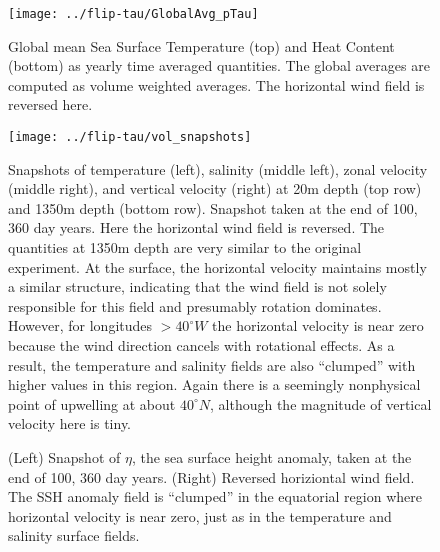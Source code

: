 \documentclass[a4paper,11pt]{article}
\begin{document}
%

\begin{figure}
\centering
\texttt{[image: ../flip-tau/GlobalAvg\_pTau]}
\caption{Global mean Sea Surface Temperature (top) and Heat Content (bottom) as yearly time averaged quantities. The global averages are computed as volume weighted averages. The horizontal wind field is reversed here.}
\label{fig:flipGlobalAvgs}
\end{figure}

\begin{figure}
\centering
\texttt{[image: ../flip-tau/vol\_snapshots]}
\caption{Snapshots of temperature (left), salinity (middle left), zonal velocity (middle right), and vertical velocity (right) at 20m depth (top row) and 1350m depth (bottom row). Snapshot taken at the end of 100, 360 day years. Here the horizontal wind field is reversed. The quantities at 1350m depth are very similar to the original experiment. At the surface, the horizontal velocity maintains mostly a similar structure, indicating that the wind field is not solely responsible for this field and presumably rotation dominates. However, for longitudes $>40^{\circ}W$ the horizontal velocity is near zero because the wind direction cancels with rotational effects. As a result, the temperature and salinity fields are also ``clumped'' with higher values in this region. Again there is a seemingly nonphysical point of upwelling at about $40^{\circ}N$, although the magnitude of vertical velocity here is tiny.}
\label{fig:flipVolSnaps}
\end{figure}

\begin{figure}
\centering
{}
\qquad
{}
\caption{(Left) Snapshot of $\eta$, the sea surface height anomaly, taken at the end of 100, 360 day years. (Right) Reversed horiziontal wind field. The SSH anomaly field is ``clumped'' in the equatorial region where horizontal velocity is near zero, just as in the temperature and salinity surface fields.} 
\label{fig:flipEtaSnap}
\end{figure}
\end{document}
